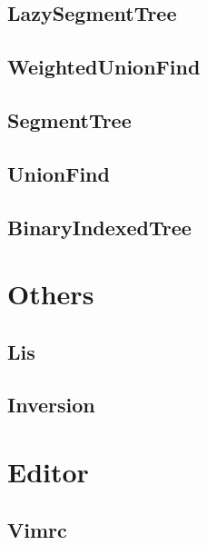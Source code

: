 \documentclass[titlepage, landscape, a4paper, twocolumn, 10pt]{ujarticle}
\begin{document}
\subsection{LazySegmentTree}


\subsection{WeightedUnionFind}


\subsection{SegmentTree}


\subsection{UnionFind}


\subsection{BinaryIndexedTree}



\section{Others}

\subsection{Lis}


\subsection{Inversion}



\section{Editor}

\subsection{Vimrc}

\end{document}

